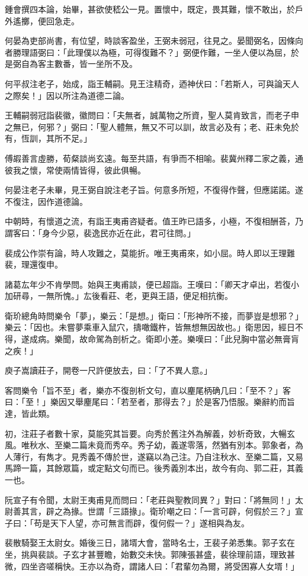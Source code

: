 鍾會撰四本論，始畢，甚欲使嵇公一見。置懷中，既定，畏其難，懷不敢出，於戶外遙擲，便回急走。

何晏為吏部尚書，有位望，時談客盈坐，王弼未弱冠，往見之。晏聞弼名，因條向者勝理語弼曰：「此理僕以為極，可得復難不？」弼便作難，一坐人便以為屈，於是弼自為客主數番，皆一坐所不及。

何平叔注老子，始成，詣王輔嗣。見王注精奇，迺神伏曰：「若斯人，可與論天人之際矣！」因以所注為道德二論。

王輔嗣弱冠詣裴徽，徽問曰：「夫無者，誠萬物之所資，聖人莫肯致言，而老子申之無已，何邪？」弼曰：「聖人體無，無又不可以訓，故言必及有；老、莊未免於有，恆訓，其所不足。」

傅嘏善言虛勝，荀粲談尚玄遠。每至共語，有爭而不相喻。裴冀州釋二家之義，通彼我之懷，常使兩情皆得，彼此俱暢。

何晏注老子未畢，見王弼自說注老子旨。何意多所短，不復得作聲，但應諾諾。遂不復注，因作道德論。

中朝時，有懷道之流，有詣王夷甫咨疑者。值王昨已語多，小極，不復相酬荅，乃謂客曰：「身今少惡，裴逸民亦近在此，君可往問。」

裴成公作崇有論，時人攻難之，莫能折。唯王夷甫來，如小屈。時人即以王理難裴，理還復申。

諸葛厷年少不肯學問。始與王夷甫談，便已超詣。王嘆曰：「卿天才卓出，若復小加研尋，一無所愧。」厷後看莊、老，更與王語，便足相抗衡。

衛玠總角時問樂令「夢」，樂云：「是想。」衛曰：「形神所不接，而夢豈是想邪？」樂云：「因也。未嘗夢乘車入鼠穴，擣噉鐵杵，皆無想無因故也。」衛思因，經日不得，遂成病。樂聞，故命駕為剖析之。衛即小差。樂嘆曰：「此兒胸中當必無膏肓之疾！」

庾子嵩讀莊子，開卷一尺許便放去，曰：「了不異人意。」

客問樂令「旨不至」者，樂亦不復剖析文句，直以麈尾柄确几曰：「至不？」客曰：「至！」樂因又舉麈尾曰：「若至者，那得去？」於是客乃悟服。樂辭約而旨達，皆此類。

初，注莊子者數十家，莫能究其旨要。向秀於舊注外為解義，妙析奇致，大暢玄風。唯秋水、至樂二篇未竟而秀卒。秀子幼，義遂零落，然猶有別本。郭象者，為人薄行，有雋才。見秀義不傳於世，遂竊以為己注。乃自注秋水、至樂二篇，又易馬蹄一篇，其餘眾篇，或定點文句而已。後秀義別本出，故今有向、郭二莊，其義一也。

阮宣子有令聞，太尉王夷甫見而問曰：「老莊與聖教同異？」對曰：「將無同！」太尉善其言，辟之為掾。世謂「三語掾」。衛玠嘲之曰：「一言可辟，何假於三？」宣子曰：「苟是天下人望，亦可無言而辟，復何假一？」遂相與為友。

裴散騎娶王太尉女。婚後三日，諸壻大會，當時名士，王裴子弟悉集。郭子玄在坐，挑與裴談。子玄才甚豐瞻，始數交未快。郭陳張甚盛，裴徐理前語，理致甚微，四坐咨嗟稱快。王亦以為奇，謂諸人曰：「君輩勿為爾，將受困寡人女壻！」

